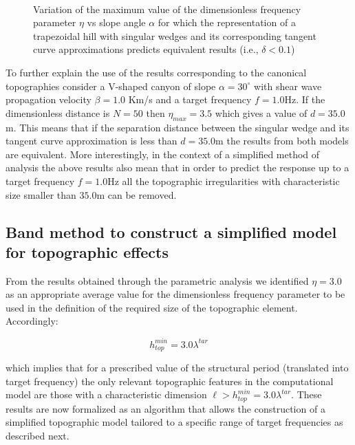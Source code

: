 \documentclass[11pt,letterpaper]{article}
\begin{document}
\begin{figure}[H]
	\centering
	\
	\hspace{-.25cm}
	\\
	\caption{Variation of the maximum value of the dimensionless frequency parameter $\eta$ vs slope angle $\alpha$ for which the representation of a trapezoidal hill with singular wedges and its corresponding tangent curve approximations predicts equivalent results (i.e., $\delta < 0.1$)}
	\label{fig:deltaLDTSyn2}
\end{figure}



To further explain the use of the results corresponding to the canonical topographies consider a V-shaped canyon of slope $\alpha = 30^\circ$ with shear wave propagation velocity $\beta = 1.0$ Km/s and a target frequency $ f= 1.0$Hz. If the dimensionless distance is $N = 50$ then $\eta_{max} = 3.5$ which gives a value of $d = 35.0$m. This means that if the separation distance between the singular wedge and its tangent curve approximation is less than $d = 35.0$m the results from both models are equivalent. More interestingly, in the context of a simplified method of analysis the above results also mean that in order to predict the response up to a target frequency $ f= 1.0$Hz all the topographic irregularities with characteristic size smaller than $35.0$m can be removed.




\subsection*{Band method to construct a simplified model for topographic effects}
\addcontentsline{toc}{subsection}{Band method}

From the results obtained through the parametric analysis we identified $\eta = 3.0$ as an appropriate average value for the dimensionless frequency parameter to be used in the definition of the required size of the topographic element. Accordingly:

\begin{equation}
h_{top}^{min} = 3.0 \lambda^{tar}
\label{Eq:target2}
\end{equation}



which implies that for a prescribed value of the structural period (translated into target frequency) the only relevant topographic features in the computational model are those with a characteristic dimension $\ell > h_{top}^{min} = 3.0 \lambda^{tar}$. These results are now formalized as an algorithm that allows the construction of a simplified topographic model tailored to a specific range of target frequencies as described next.
\end{document}
